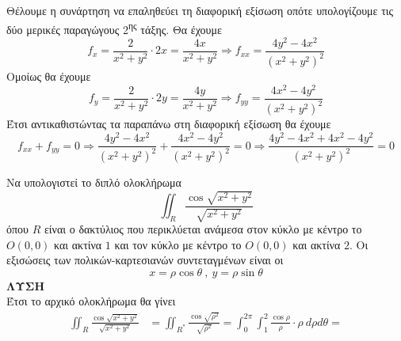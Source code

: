 \documentclass[internet]{diag-xelatex}
\newcommand{\tss}[1]{\textsuperscript{#1}}
\newcommand{\lysh}{\textbf{\textcolor{\xrwma}{ΛΥΣΗ}}}
\begin{document}
\begin{thema}[start=2]
\begin{rlist}
\begin{itemize}
\end{itemize}
\item Θέλουμε η συνάρτηση να επαληθεύει τη διαφορική εξίσωση οπότε υπολογίζουμε τις δύο μερικές παραγώγους 2\tss{ης} τάξης. Θα έχουμε
\[ f_{x}=\frac{2}{x^2+y^2}\cdot2x=\frac{4x}{x^2+y^2}\Rightarrow f_{xx}=\frac{4y^2-4x^2}{\left(x^2+y^2 \right)^2 } \]
Ομοίως θα έχουμε
\[ f_{y}=\frac{2}{x^2+y^2}\cdot2y=\frac{4y}{x^2+y^2}\Rightarrow f_{yy}=\frac{4x^2-4y^2}{\left(x^2+y^2 \right)^2 } \]
Έτσι αντικαθιστώντας τα παραπάνω στη διαφορική εξίσωση θα έχουμε
\[ f_{xx}+f_{yy}=0\Rightarrow \frac{4y^2-4x^2}{\left(x^2+y^2 \right)^2 }+\frac{4x^2-4y^2}{\left(x^2+y^2 \right)^2 }=0\Rightarrow\frac{4y^2-4x^2+4x^2-4y^2}{\left(x^2+y^2 \right)^2 }=0 \]
\end{rlist}
\item Να υπολογιστεί το διπλό ολοκλήρωμα
\[ \iint_{R}{\frac{\cos{\sqrt{x^2+y^2}}}{\sqrt{x^2+y^2}}} \]
όπου $ R $ είναι ο δακτύλιος που περικλύεται ανάμεσα στον κύκλο με κέντρο το $ O(0,0) $ και ακτίνα $ 1 $ και τον κύκλο με κέντρο το $ O(0,0) $ και ακτίνα $ 2 $. Οι εξισώσεις των πολικών-καρτεσιανών συντεταγμένων είναι οι
\[ x=\rho\cos{\theta}\ ,\ y=\rho\sin{\theta} \]
\lysh\\
Έτσι το αρχικό ολοκλήρωμα θα γίνει
\begin{align*}
\iint_{R}{\frac{\cos{\sqrt{x^2+y^2}}}{\sqrt{x^2+y^2}}}&=\iint_{R^*}{\frac{\cos{\sqrt{\rho^2}}}{\sqrt{\rho^2}}}=\int_{0}^{2\pi}{\int_{1}^{2}{\frac{\cos{\rho}}{\rho}\cdot\rho}\ d\rho d\theta}=\\

\end{align*}
\end{thema}
\end{document}
